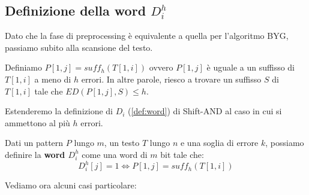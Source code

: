 \subsection{Definizione della word $D_i^h$}
Dato che la fase di preprocessing è equivalente a quella per l'algoritmo BYG,
passiamo subito alla scansione del testo.
\begin{definizione}
    Definiamo $P[1, j] = suff_h(T[1, i])$ ovvero $P[1, j]$ è uguale a un
    suffisso di $T[1, i]$ a meno di $h$ errori. In altre parole, riesco a
    trovare un suffisso $S$ di $T[1, i]$ tale che $ED(P[1, j], S) \leq h$.
\end{definizione}
Estenderemo la definizione di $D_i$ (\ref{def:word}) di Shift-AND al caso in cui
si ammettono al più $h$ errori.
\begin{definizione}
    Dati un pattern $P$ lungo $m$, un testo $T$ lungo $n$ e una soglia di errore
    $k$, possiamo definire la \textbf{word $D_i^h$} come una word di $m$ bit
    tale che:
    \begin{equation}
        D_i^h[j] = 1 \iff P[1, j] = suff_h(T[1, i])
    \end{equation}
\end{definizione}
Vediamo ora alcuni casi particolare:
